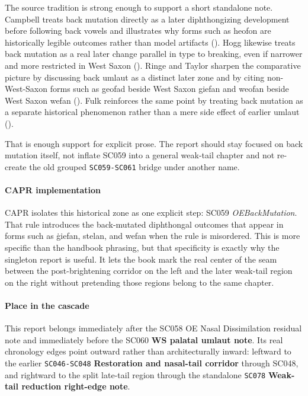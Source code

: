 \documentclass[
  british,
  a4paper,
]{article}
\begin{document}
The source tradition is strong enough to support a short standalone
note. Campbell treats back mutation directly as a later diphthongizing
development before following back vowels and illustrates why forms such
as heofon are historically legible outcomes rather than model artifacts
(). Hogg likewise
treats back mutation as a real later change parallel in type to
breaking, even if narrower and more restricted in West Saxon
(). Ringe and Taylor sharpen the
comparative picture by discussing back umlaut as a distinct later zone
and by citing non-West-Saxon forms such as geofad beside West Saxon
giefan and weofan beside West Saxon wefan
().
Fulk reinforces the same point by treating back mutation as a separate
historical phenomenon rather than a mere side effect of earlier umlaut
().

That is enough support for explicit prose. The report should stay
focused on back mutation itself, not inflate SC059 into a general
weak-tail chapter and not re-create the old grouped \texttt{SC059-SC061}
bridge under another name.

\paragraph{CAPR implementation}\label{capr-implementation-37}

CAPR isolates this historical zone as one explicit step: SC059
\emph{OEBackMutation}. That rule introduces the back-mutated diphthongal
outcomes that appear in forms such as ġiefan, stelan, and wefan when the
rule is misordered. This is more specific than the handbook phrasing,
but that specificity is exactly why the singleton report is useful. It
lets the book mark the real center of the seam between the
post-brightening corridor on the left and the later weak-tail region on
the right without pretending those regions belong to the same chapter.

\paragraph{Place in the cascade}\label{place-in-the-cascade-37}

This report belongs immediately after the SC058 OE Nasal Dissimilation
residual note and immediately before the SC060 \textbf{WS palatal umlaut
note}. Its real chronology edges point outward rather than
architecturally inward: leftward to the earlier \texttt{SC046-SC048}
\textbf{Restoration and nasal-tail corridor} through SC048, and
rightward to the split late-tail region through the standalone
\texttt{SC078} \textbf{Weak-tail reduction right-edge note}.
\end{document}
